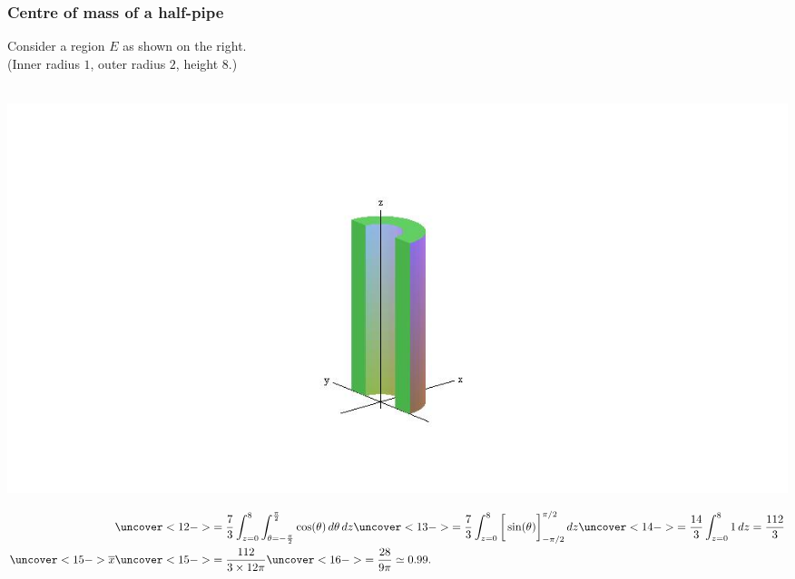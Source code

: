 \documentclass[9pt]{beamer}
\begin{document}
\begin{frame}[t] 
 \frametitle{Centre of mass of a half-pipe} 
 \begin{minipage}[t]{8cm}
  Consider a region $E$ as shown on the right.\\
  (Inner radius $1$, outer radius $2$, height $8$.)\\
  \\
 \end{minipage}\begin{minipage}[t]{3cm}
  \vspace{0pt}
  \includegraphics[scale=0.5,clip=true,trim=14cm 3cm 14cm 4cm]{images/half_pipe.jpg}
 \end{minipage}
 \vspace{-7ex}
  \begin{align*}
    &\uc<12->{= \frac{7}{3} \int_{z=0}^8 \int_{\tht=-\frac{\pi}{2}}^{\frac{\pi}{2}} 
     \cos(\tht) \,d\tht\,dz }
     \uc<13->{= \frac{7}{3} \int_{z=0}^8 \CH{\sin(\tht)}_{-\pi/2}^{\pi/2} dz }
     \uc<14->{= \frac{14}{3} \int_{z=0}^8 1\,dz = \frac{112}{3}} \\
    \uc<15->{\ov{x}} &\uc<15->{= \frac{112}{3\tm 12\pi}}
     \uc<16->{ = \frac{28}{9\pi} \simeq 0.99.}
  \end{align*}
\end{frame}
\end{document}
